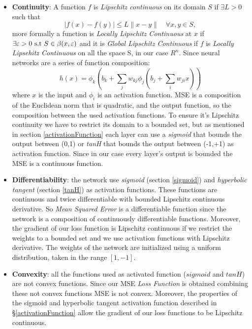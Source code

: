 \begin{itemize}
	\item \textbf{Continuity}: A function $f$ is \textit{ Lipschitz continuous} on its domain $S$ if $\exists L>0$ such that
	\begin{equation}
	|f(x)-f(y)| \leq L\parallel x-y\parallel \quad \forall x,y \in S,  
	\end{equation} 
	more formally a function is  \textit{Locally Lipschitz Continuous} at $x$ if $\exists \varepsilon >0 \textnormal{ s.t } S \in \beta(x,\varepsilon) $
	and it is \textit{Global Lipschitz Continuous} if $f$ is \textit{Locally Lipschitz Continuous} on all the space S, in our case $R^n$.
	Since neural networks are a series of function composition: 
	\begin{equation}
	h(x) = \phi_{k}(b_{k} + \sum_{j}w_{kj} \phi_{j}(b_{j} + \sum_{i}w_{ji}x))
	\end{equation}
	where $x$ is the input and $\phi_{i}$ is an activation function. MSE is a composition of the Euclidean norm that is quadratic, and the output function, so the composition between the used activation functions. To ensure it's Lipschitz continuity we have to restrict its domain to a bounded set, but as mentioned in section \ref{activationFunction} each layer can use a \textit{sigmoid} that bounds the output between (0,1) or \textit{tanH} that bounds the output  between (-1,+1) as activation function. Since in our case every layer's output is bounded the MSE is a continuous function.	
	\item  \textbf{Differentiability}:  the network use \textit{sigmoid} (section \ref{sigmoid}) and \textit{hyperbolic tangent} (section \ref{tanH}) as activation functions. These functions are continuous and twice differentiable with bounded Lipschitz continuous derivative. So \textit{Mean Squared Error} is a differentiable function since the network is a composition of continuously differentiable functions. Moreover, the gradient of our loss function is Lipschitz continuous if we restrict the weights to a bounded set and we use activation functions with Lipschitz derivative. The weights of the network are initialized using a uniform distribution, taken in the range $[1,-1]$.
	\item \textbf{Convexity}: all the functions used as activated function ($sigmoid$ and $tanH$) are not convex functions. Since our MSE \textit{Loss Function} is obtained combining these not convex functions MSE is not convex. Moreover, the properties of the sigmoid and hyperbolic tangent activation function described in \S \ref{activationFunction} allow the gradient of our loss functions to be Lipschitz continuous.
\end{itemize}


